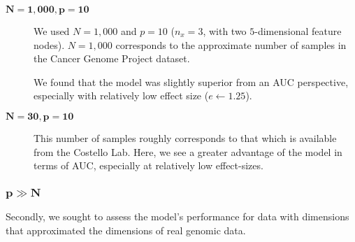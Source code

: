 \begin{description}
\item[$\mathbf{N=1,000, p=10}$] We used $N=1,000$ and $p=10$
  ($n_x = 3$, with two $5$-dimensional feature nodes). $N=1,000$
  corresponds to the approximate number of samples in the Cancer
  Genome Project\cite{ledford_end_2015} dataset.

  We found that the model was slightly superior from an AUC
  perspective, especially with relatively low effect size
  ($e \leftarrow 1.25$). 


        


  
  \item[$\mathbf{N=30,p=10}$] This number of samples roughly
    corresponds to that which is available from the Costello
    Lab. Here, we see a greater advantage of the model in terms of
    AUC, especially at relatively low effect-sizes. 
    
  \end{description}

\subsubsection{$\mathbf{p \gg N}$}

Secondly, we sought to assess the model's performance for data with dimensions that approximated the dimensions of real genomic data.

